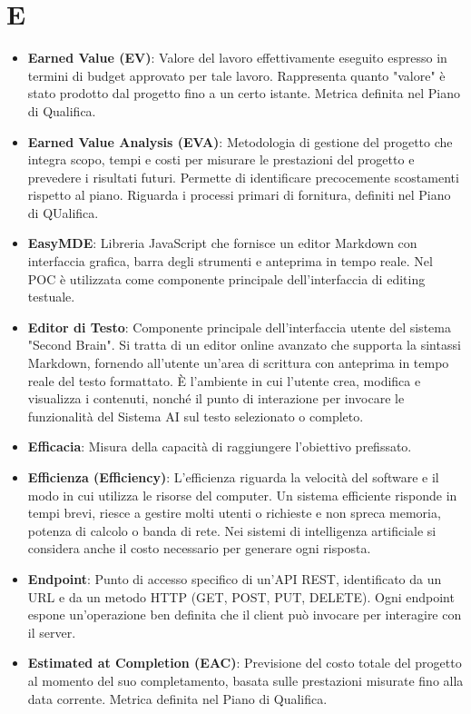 \documentclass[11pt,a4paper]{article}
\begin{document}
\section*{E}
\begin{itemize}
\item \textbf{Earned Value (EV)}: Valore del lavoro effettivamente eseguito espresso in termini di budget approvato per tale lavoro. Rappresenta quanto "valore" è stato prodotto dal progetto fino a un certo istante. Metrica definita nel Piano di Qualifica.

\item \textbf{Earned Value Analysis (EVA)}: Metodologia di gestione del progetto che integra scopo, tempi e costi per misurare le prestazioni del progetto e prevedere i risultati futuri. Permette di identificare precocemente scostamenti rispetto al piano. Riguarda i processi primari di fornitura, definiti nel Piano di QUalifica.

\item \textbf{EasyMDE}: Libreria JavaScript che fornisce un editor Markdown con interfaccia grafica, barra degli strumenti e anteprima in tempo reale. Nel POC è utilizzata come componente principale dell'interfaccia di editing testuale.

\item \textbf{Editor di Testo}: Componente principale dell'interfaccia utente del sistema "Second Brain". Si tratta di un editor online avanzato che supporta la sintassi Markdown, fornendo all'utente un'area di scrittura con anteprima in tempo reale del testo formattato. È l'ambiente in cui l'utente crea, modifica e visualizza i contenuti, nonché il punto di interazione per invocare le funzionalità del Sistema AI sul testo selezionato o completo.

\item \textbf{Efficacia}: Misura della capacità di raggiungere l'obiettivo prefissato.

\item \textbf{Efficienza (Efficiency)}: L’efficienza riguarda la velocità del software e il modo in cui utilizza le risorse del computer. Un sistema efficiente risponde in tempi brevi, riesce a gestire molti utenti o richieste e non spreca memoria, potenza di calcolo o banda di rete. Nei sistemi di intelligenza artificiale si considera anche il costo necessario per generare ogni risposta.

\item \textbf{Endpoint}: Punto di accesso specifico di un'API REST, identificato da un URL e da un metodo HTTP (GET, POST, PUT, DELETE). 
Ogni endpoint espone un'operazione ben definita che il client può invocare per interagire con il server.

\item \textbf{Estimated at Completion (EAC)}: Previsione del costo totale del progetto al momento del suo completamento, basata sulle prestazioni misurate fino alla data corrente. Metrica definita nel Piano di Qualifica.

\end{itemize}
\newpage
\end{document}
